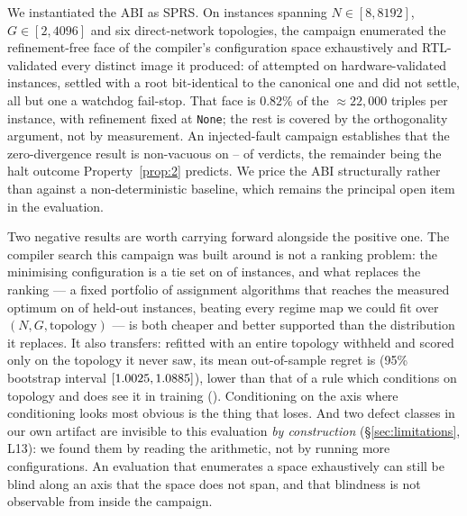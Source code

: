 \documentclass[journal,10pt]{IEEEtran}
\theoremstyle{plain}
\theoremstyle{definition}
\theoremstyle{remark}
\newcommand{\sprs}{\textsc{SPRS}}
\newcommand{\sv}[1]{\texttt{#1}}
\begin{document}
We instantiated the ABI as \sprs{}. On \SuiteSize{} instances spanning
$N \in [8,8192]$, $G \in [2,4096]$ and six direct-network topologies, the
campaign enumerated the refinement-free face of the compiler's configuration
space exhaustively and RTL-validated every distinct image it produced: of
\InvAttempted{} attempted on \TournNInst{} hardware-validated instances,
\WallTBs{} settled with a root bit-identical to the canonical one and
\InvNonSettling{} did not settle, all but one a watchdog fail-stop. That face
is $0.82\%$ of the $\approx\!22{,}000$ triples per instance, with refinement
fixed at \sv{None}; the rest is covered by the orthogonality argument, not by
measurement. An injected-fault campaign establishes that the zero-divergence
result is non-vacuous on \MutOracleLo{}--\MutOracleHi{} of \MutTotal{}
verdicts, the remainder being the halt outcome Property~\ref{prop:2} predicts.
We price the ABI structurally rather than against a non-deterministic
baseline, which remains the principal open item in the evaluation.

Two negative results are worth carrying forward alongside the positive one.
The compiler search this campaign was built around is not a ranking problem:
the minimising configuration is a tie set on \ClsTied{} of \TournNInst{}
instances, and what replaces the ranking --- a fixed portfolio of
\SelConfigsRun{} assignment algorithms that reaches the measured optimum on
\SelKFourOpt{} of \TournNInst{} held-out instances, beating every regime map
we could fit over $(N,G,\text{topology})$ --- is both cheaper and better
supported than the distribution it replaces. It also transfers: refitted with
an entire topology withheld and scored only on the topology it never saw, its
mean out-of-sample regret is \SelUnseenTopoMean{} (95\% bootstrap interval
$[1.0025, 1.0885]$), lower than that of a rule which
conditions on topology and does see it in training (\SelCondTopoMean{}).
Conditioning on the axis where conditioning looks most obvious is the thing
that loses. And two defect classes in our own
artifact are invisible to this evaluation \emph{by construction}
(\S\ref{sec:limitations}, L13): we found them by reading the arithmetic, not
by running more configurations. An evaluation that enumerates a space
exhaustively can still be blind along an axis that the space does not span,
and that blindness is not observable from inside the campaign.
\end{document}
